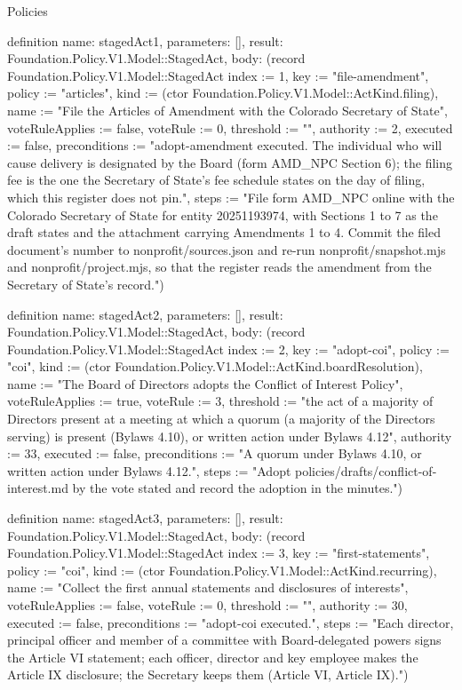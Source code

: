 \begin{lexlean}{Policies}
\begin{semanticmodule}
definition{
  name: stagedAct1,
  parameters: [],
  result: Foundation.Policy.V1.Model::StagedAct,
  body: (record Foundation.Policy.V1.Model::StagedAct {index := 1, key := "file-amendment", policy := "articles", kind := (ctor Foundation.Policy.V1.Model::ActKind.filing), name := "File the Articles of Amendment with the Colorado Secretary of State", voteRuleApplies := false, voteRule := 0, threshold := "", authority := 2, executed := false, preconditions := "adopt-amendment executed. The individual who will cause delivery is designated by the Board (form AMD_NPC Section 6); the filing fee is the one the Secretary of State's fee schedule states on the day of filing, which this register does not pin.", steps := "File form AMD_NPC online with the Colorado Secretary of State for entity 20251193974, with Sections 1 to 7 as the draft states and the attachment carrying Amendments 1 to 4. Commit the filed document's number to nonprofit/sources.json and re-run nonprofit/snapshot.mjs and nonprofit/project.mjs, so that the register reads the amendment from the Secretary of State's record."})
}

definition{
  name: stagedAct2,
  parameters: [],
  result: Foundation.Policy.V1.Model::StagedAct,
  body: (record Foundation.Policy.V1.Model::StagedAct {index := 2, key := "adopt-coi", policy := "coi", kind := (ctor Foundation.Policy.V1.Model::ActKind.boardResolution), name := "The Board of Directors adopts the Conflict of Interest Policy", voteRuleApplies := true, voteRule := 3, threshold := "the act of a majority of Directors present at a meeting at which a quorum (a majority of the Directors serving) is present (Bylaws 4.10), or written action under Bylaws 4.12", authority := 33, executed := false, preconditions := "A quorum under Bylaws 4.10, or written action under Bylaws 4.12.", steps := "Adopt policies/drafts/conflict-of-interest.md by the vote stated and record the adoption in the minutes."})
}

definition{
  name: stagedAct3,
  parameters: [],
  result: Foundation.Policy.V1.Model::StagedAct,
  body: (record Foundation.Policy.V1.Model::StagedAct {index := 3, key := "first-statements", policy := "coi", kind := (ctor Foundation.Policy.V1.Model::ActKind.recurring), name := "Collect the first annual statements and disclosures of interests", voteRuleApplies := false, voteRule := 0, threshold := "", authority := 30, executed := false, preconditions := "adopt-coi executed.", steps := "Each director, principal officer and member of a committee with Board-delegated powers signs the Article VI statement; each officer, director and key employee makes the Article IX disclosure; the Secretary keeps them (Article VI, Article IX)."})
}


\end{semanticmodule}
\end{lexlean}
